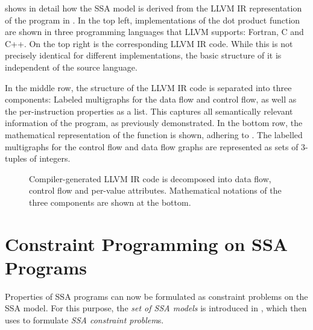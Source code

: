      shows in detail how the SSA model is derived from the
    LLVM IR representation of the program in .
    In the top left, implementations of the dot product function are shown
    in three programming languages that LLVM supports: Fortran, C and C++.
    On the top right is the corresponding LLVM IR code.
    While this is not precisely identical for different implementations,
    the basic structure of it is independent of the source language.

    In the middle row, the structure of the LLVM IR code is separated into three
    components:
    Labeled multigraphs for the data flow and control flow, as well as
    the per-instruction properties as a list.
    This captures all semantically relevant information of the program,
    as previously demonstrated.
    In the bottom row, the mathematical representation of the function is shown,
    adhering to .
    The labelled multigraphs for the control flow and data flow graphs are
    represented as sets of $3$-tuples of integers.

\begin{figure}[p]

\caption{Compiler-generated LLVM IR code is decomposed into data flow, control
         flow and per-value attributes.
         Mathematical notations of the three components are shown at the
         bottom.}
\label{fig:derivemaths}
\end{figure}

\section{Constraint Programming on SSA Programs}
\label{sec:constraintprogramming}

    Properties of SSA programs can now be formulated as constraint problems on
    the SSA model.
    For this purpose, the {\it set of SSA models} is introduced in
    , which  then uses to
    formulate {\em SSA constraint problem}s.

